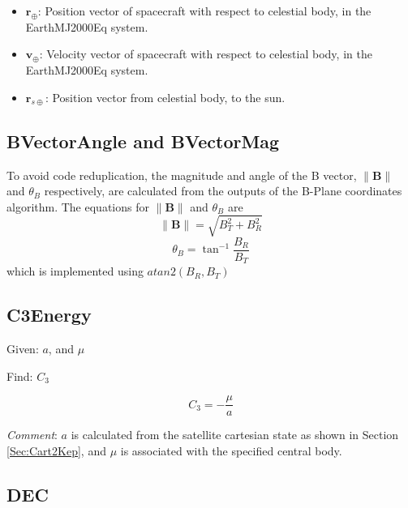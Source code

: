 \begin{itemize}
     \item $\mathbf{r}_\oplus$:  Position vector of spacecraft
     with respect to celestial body, in the EarthMJ2000Eq system.

     \item $\mathbf{v}_\oplus$:  Velocity vector of spacecraft
     with respect to celestial body, in the EarthMJ2000Eq system.

     \item $\mathbf{r}_{s\oplus}$:  Position vector from celestial
     body, to the sun.
\end{itemize}

\subsection{BVectorAngle and BVectorMag} 

To avoid code reduplication, the magnitude and angle of the B
vector, $\|\mathbf{B}\|$ and  $\theta_B$ respectively,  are
calculated from the outputs of the B-Plane coordinates algorithm.
The equations for $\|\mathbf{B}\|$ and $\theta_B$ are
%
\begin{equation}
    \|\mathbf{B}\| = \sqrt{ B_T^2 + B_R^2}
\end{equation}
%
%
\begin{equation}
     \theta_B = \tan^{-1}{\frac{B_R}{B_T}}
\end{equation}
%
which is implemented using $atan2( B_R , B_T )$

\subsection{C3Energy}

Given:  $a$, and $\mu$

\noindent Find:  $C_3$

\begin{equation}
    C_3 = -\frac{\mu}{a}
\end{equation}

\noindent \textit{Comment}:  $a$ is calculated from the satellite
cartesian state as shown in Section \ref{Sec:Cart2Kep}, and $\mu$ is
associated with the specified central body.

\subsection{DEC} 

